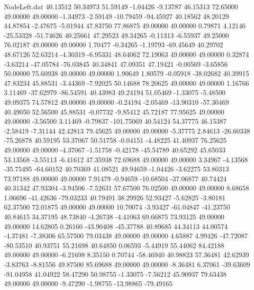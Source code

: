 \begin{filecontents}{NodeLeft.dat}
  40.13512   50.34973   51.59149    -1.04426   -9.13787   46.15313   72.65000   49.00000   49.00000   -1.34973   -2.59149  -10.79459  -94.45927
  40.18562   48.20129   44.87854    -2.47675   -5.01944   47.83750   77.86875   49.00000   49.00000    0.79871    4.12146  -25.53328  -51.74626
  40.25661   47.29523   49.34265    -0.11313   -6.55937   49.25000   76.02187   49.00000   49.00000    1.70477   -0.34265   -1.19793  -69.45649
  40.29702   48.67126   52.63214    -4.30319   -6.95331   48.64062   72.19063   49.00000   49.00000    0.32874   -3.63214  -47.05784  -76.03845
  40.34841   47.09351   47.19421    -0.00569   -3.65856   50.00000   75.60938   49.00000   49.00000    1.90649    1.80579   -0.05918  -38.02682
  40.39915   47.83234   45.88531    -3.44369   -7.92025   50.14688   78.20625   49.00000   49.00000    1.16766    3.11469  -37.62979  -86.54591
  40.43983   49.24194   51.05469    -1.33075   -5.48500   49.09375   74.57812   49.00000   49.00000   -0.24194   -2.05469  -13.90310  -57.30469
  40.49050   52.56500   45.88531    -0.07732   -9.85412   45.72187   77.95625   49.00000   49.00000   -3.56500    3.11469   -0.79837 -101.75069
  40.54124   54.37775   46.15387    -2.58419   -7.31144   42.42813   79.45625   49.00000   49.00000   -5.37775    2.84613  -26.60338  -75.26878
  40.59195   53.37067   50.51758    -0.04151   -4.48225   41.40937   76.25625   49.00000   49.00000   -4.37067   -1.51758   -0.42178  -45.54789
  40.65292   45.65033   53.13568    -3.55113   -6.41612   47.35938   72.69688   49.00000   49.00000    3.34967   -4.13568  -35.75495  -64.60152
  40.70369   41.08521   49.94659    -1.04426   -3.62275   53.80313   73.97188   49.00000   49.00000    7.91479   -0.94659  -10.68504  -37.06877
  40.74424   40.31342   47.93304    -3.94506   -7.52631   57.67500   76.02500   49.00000   49.00000    8.68658    1.06696  -41.42636  -79.03233
  40.79491   38.29926   52.93427    -5.62825   -3.80181   62.37500   72.01875   49.00000   49.00000   10.70074   -3.93427  -61.04847  -41.23750
  40.84615   34.37195   48.73840    -4.26738   -4.41063   69.66875   73.93125   49.00000   49.00000   14.62805    0.26160  -43.90408  -45.37788
  40.89685   44.34113   44.00574    -4.37481   -7.38306   65.57500   79.03438   49.00000   49.00000    4.65887    4.99426  -47.72087  -80.53510
  40.93751   55.21698   40.64850     0.06593   -5.44919   55.44062   84.42188   49.00000   49.00000   -6.21698    8.35150    0.70744  -58.46940
  40.98823   57.36481   42.62939    -3.83763   -8.81556   49.87500   85.69688   49.00000   49.00000   -8.36481    6.37061  -39.63609  -91.04958
  41.04922   58.47290   50.98755    -1.33075   -7.56212   45.90937   79.63438   49.00000   49.00000   -9.47290   -1.98755  -13.98865  -79.49165

\end{filecontents}
